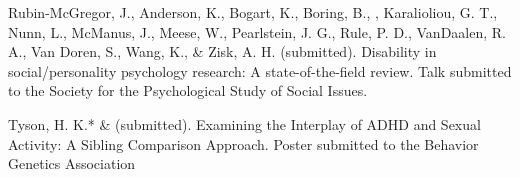 

\item Rubin-McGregor, J., Anderson, K., Bogart, K., Boring, B., \meb, Karalioliou, G. T., Nunn, L., McManus, J., Meese, W., Pearlstein, J. G., Rule, P. D., VanDaalen, R. A., Van Doren, S., Wang, K., \& Zisk, A. H. (submitted). Disability in social/personality psychology research: A state-of-the-field review. Talk submitted to the Society for the Psychological Study of Social Issues. 



\item Tyson, H. K.* \& \meb (submitted). Examining the Interplay of ADHD and Sexual Activity: A Sibling Comparison Approach. Poster submitted to the Behavior Genetics Association




